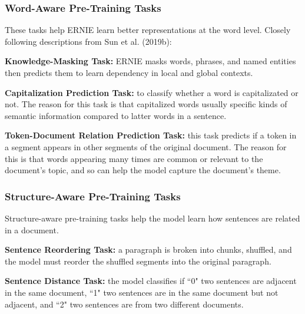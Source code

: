 \subsubsection{Word-Aware Pre-Training Tasks}\label{sec:WordAwarePretrainingTask}

These tasks help ERNIE learn better representations at the word level. Closely following descriptions from Sun et al. (2019b): 

\begin{itemizeSpaced}{4pt}
    \item \textbf{Knowledge-Masking Task: }ERNIE masks words, phrases, and named entities then predicts them to learn dependency in local and global contexts. 
    
    \item \textbf{Capitalization Prediction Task: }to classify whether a word is capitalizated or not. The reason for this task is that capitalized words usually specific kinds of semantic information compared to latter words in a sentence. 
    
    \item \textbf{Token-Document Relation Prediction Task: } this task predicts if a token in a segment appears in other segments of the original document. The reason for this is that words appearing many times are common or relevant to the document's topic, and so can help the model capture the document's theme. 
    
\end{itemizeSpaced}



\subsubsection{Structure-Aware Pre-Training Tasks}\label{sec:StructureAwarePretrainingTask}

Structure-aware pre-training tasks help the model learn how sentences are related in a document. 

\begin{itemizeSpaced}{4pt}

    \item \textbf{Sentence Reordering Task: }a paragraph is broken into chunks, shuffled, and the model must reorder the shuffled segments into the original paragraph. 
    
    \item \textbf{Sentence Distance Task: }the model classifies if ``0" two sentences are adjacent in the same document, ``1" two sentences are in the same document but not adjacent, and ``2" two sentences are from two different documents.
\end{itemizeSpaced}




